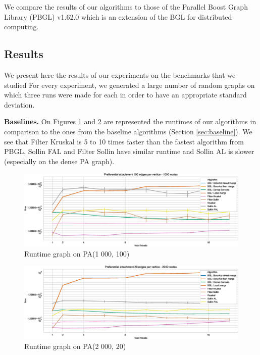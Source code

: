\documentclass[letterpaper]{article}
\newcommand{\mypar}[1]{{\bf #1.}}
\begin{document}
We compare the results of our algorithms to those of the Parallel Boost Graph Library (PBGL) v1.62.0 which is an extension of the BGL for distributed computing.


\subsection{Results} We present here the results of our experiments on the benchmarks that we studied For every experiment, we generated a large number of random graphs on which three runs were made for each in order to have an appropriate standard deviation.

\mypar{Baselines} On Figures \ref{baseline1} and \ref{baseline2} are represented the runtimes of our algorithms in comparison to the ones from the baseline algorithms (Section \ref{sec:baseline}). We see that Filter Kruskal is 5 to 10 times faster than the fastest algorithm from PBGL, Sollin FAL and Filter Sollin have similar runtime and Sollin AL is slower (especially on the dense PA graph).

\begin{figure}\centering
  \includegraphics[width=\linewidth]{graphics/Graph_runtime_Preferential_attachment_100_edges_per_vertice_1000.eps}
  \caption{Runtime graph on PA(1 000, 100)\label{baseline1}}
\end{figure}

\begin{figure}\centering
  \includegraphics[width=\linewidth]{graphics/Graph_runtime_Preferential_attachment_20_edges_per_vertice_2000.eps}
  \caption{Runtime graph on PA(2 000, 20)\label{baseline2}}
\end{figure}
\end{document}

